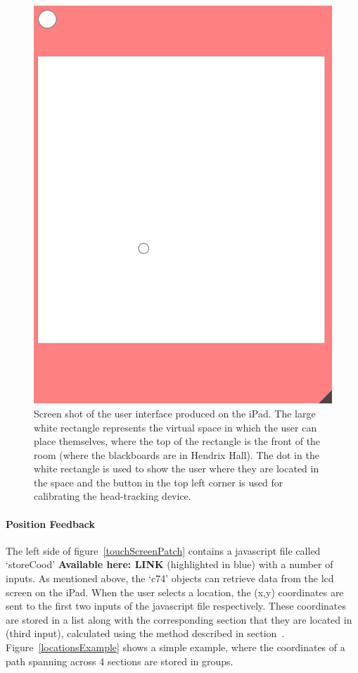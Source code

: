 \documentclass[../../main.tex]{subfiles}
\begin{document}
			\begin{figure}[H]
				\centerline{\includegraphics[scale = 0.15]{Sections/Implementation/Max/images/Max/UserInterface/UI_dot.png}}
				\caption{Screen shot of the user interface produced on the iPad. The large white rectangle represents the virtual space in which the user can place themselves, where the top of the rectangle is the front of the room (where the blackboards are in Hendrix Hall). The dot in the white rectangle is used to show the user where they are located in the space and the button in the top left corner is used for calibrating the head-tracking device.}
				\label{UIdot}
			\end{figure}

		\paragraph{Position Feedback}
			The left side of figure~\ref{touchScreenPatch} contains a javascript file called `storeCood' \textbf{Available here: LINK} (highlighted in blue) with a number of inputs. As mentioned above, the `c74' objects can retrieve data from the lcd screen on the iPad. When the user selects a location, the (x,y) coordinates are sent to the first two inputs of the javascript file respectively. These coordinates are stored in a list along with the corresponding section that they are located in (third input), calculated using the method described in section~. Figure~\ref{locationsExample} shows a simple example, where the coordinates of a path spanning across 4 sections are stored in groups.
\end{document}
